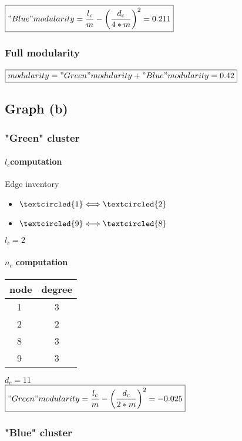 \documentclass[a4paper]{article}
\begin{document}
$\boxed{"Blue" modularity=\frac{l_{c}}{m} - \left(\frac{d_{c}}{4*m}\right)^{2}=0.211}$

\subsubsection{Full modularity}
$\boxed{modularity="Green" modularity + "Blue" modularity=0.42}$

\subsection{Graph (b)}

\subsubsection{ "Green" cluster}

\paragraph{$l_{c}$computation}

Edge inventory
\begin{itemize}
\item $\textcircled{1}\Longleftrightarrow \textcircled{2}$
\item $\textcircled{9}\Longleftrightarrow \textcircled{8}$
\end{itemize}
$\boxed{l_{c}=2}$
\paragraph{$n_{c}$ computation}

\begin{table}[h]
\begin{tabular}{|c|c|}
\hline
node&degree\\
\hline
\textcircled{1}& 3\\
\textcircled{2}& 2\\
\textcircled{8}& 3\\
\textcircled{9}& 3\\
\hline
\end{tabular}

\end{table}
$\boxed{d_{c}=11}$
\\

$\boxed{"Green" modularity=\frac{l_{c}}{m} - \left(\frac{d_{c}}{2*m}\right)^{2}=-0.025}$

\subsubsection{ "Blue" cluster}
\end{document}
